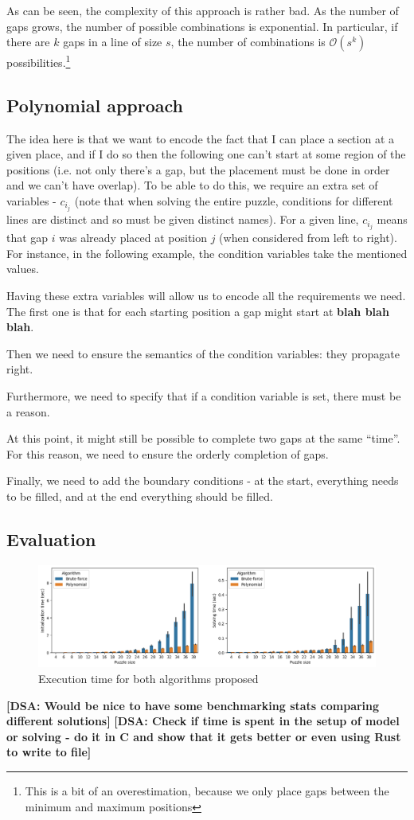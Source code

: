 \documentclass[12pt]{article}
\newcommand{\blah}{\textbf{blah blah blah}}
\newcommand{\dsa}[1]{\textbf{[DSA: #1]}}
\begin{document}
\noindent As can be seen, the complexity of this approach is rather bad. As the number of gaps grows, the number of possible combinations is exponential. In particular, if there are $k$ gaps in a line of size $s$, the number of combinations is $\mathcal{O}(s^k)$ possibilities.\footnote{This is a bit of an overestimation, because we only place gaps between the minimum and maximum positions}

\subsection*{Polynomial approach}

The idea here is that we want to encode the fact that I can place a section at a given place, and if I do so then the following one can't start at some region of the positions (i.e. not only there's a gap, but the placement must be done in order and we can't have overlap).
To be able to do this, we require an extra set of variables - $c_i_j$ (note that when solving the entire puzzle, conditions for different lines are distinct and so must be given distinct names).
\noindent For a given line, $c_i_j$ means that gap $i$ was already placed at position $j$ (when considered from left to right).
For instance, in the following example, the condition variables take the mentioned values.

\noindent Having these extra variables will allow us to encode all the requirements we need.
The first one is that for each starting position a gap might start at \blah{}.

\noindent Then we need to ensure the semantics of the condition variables: they propagate right.

\noindent Furthermore, we need to specify that if a condition variable is set, there must be a reason.

\noindent At this point, it might still be possible to complete two gaps at the same ``time''.
For this reason, we need to ensure the orderly completion of gaps.

\noindent Finally, we need to add the boundary conditions - at the start, everything needs to be filled, and at the end everything should be filled.

\subsection*{Evaluation}

\begin{figure}[h]
  \includegraphics[scale=0.5]{bench.png}
  \centering
  \caption{Execution time for both algorithms proposed}
  \label{fig:bench}
\end{figure}

\dsa{Would be nice to have some benchmarking stats comparing different solutions}
\dsa{Check if time is spent in the setup of model or solving - do it in C and show that it gets better or even using Rust to write to file}

\end{document}
